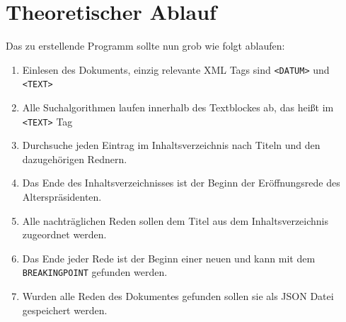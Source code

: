 \section{Theoretischer Ablauf}
Das zu erstellende Programm sollte nun grob wie folgt ablaufen:
\begin{enumerate}
	\item Einlesen des Dokuments, einzig relevante XML Tags sind \lstinline|<DATUM>| und \lstinline|<TEXT>|
	\item Alle Suchalgorithmen laufen innerhalb des Textblockes ab, das heißt im \lstinline|<TEXT>| Tag
	\item Durchsuche jeden Eintrag im Inhaltsverzeichnis nach Titeln und den dazugehörigen Rednern.
	\item Das Ende des Inhaltsverzeichnisses ist der Beginn der Eröffnungsrede des Alterspräsidenten.
	\item Alle nachträglichen Reden sollen dem Titel aus dem Inhaltsverzeichnis zugeordnet werden.
	\item Das Ende jeder Rede ist der Beginn einer neuen und kann mit dem \lstinline|BREAKINGPOINT| gefunden werden.
	\item Wurden alle Reden des Dokumentes gefunden sollen sie als JSON Datei gespeichert werden.
\end{enumerate}